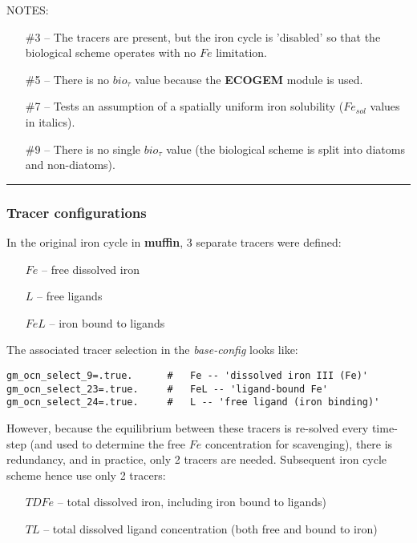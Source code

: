 \documentclass[11pt,fleqn]{book} %
\begin{document}
\noindent \small NOTES: \normalsize
\vspace{1mm}
\footnotesize
\begin{itemize}[noitemsep]
\setlength{\itemindent}{-.15in}
\item [\#3] -- The tracers are present, but the iron cycle is 'disabled' so that the biological scheme operates with no \(Fe\) limitation.
\item [\#5] -- There is no \(bio_{\tau}\) value because the \textbf{ECOGEM} module is used.
\item [\#7] -- Tests an assumption of a spatially uniform iron solubility (\(Fe_{sol}\) values in italics).
\item [\#9] -- There is no single \(bio_{\tau}\) value (the biological scheme is split into diatoms and non-diatoms).
\end{itemize}
\normalsize

%
\noindent\rule{4cm}{0.5pt}
\subsubsection{Tracer configurations}
\vspace{2mm}

In the original iron cycle in \textbf{muffin},  3 separate tracers were defined:
\vspace{1mm}
\begin{itemize}[noitemsep]
\item [\(Fe\)] -- free dissolved iron
\item [\(L\)] -- free ligands
\item [\(FeL\)] -- iron bound to ligands
\end{itemize}
\vspace{2mm}
The associated tracer selection in the \textit{base-config} looks like:
\footnotesize\vspace{-2pt}\begin{verbatim}
gm_ocn_select_9=.true.      #   Fe -- 'dissolved iron III (Fe)'
gm_ocn_select_23=.true.     #   FeL -- 'ligand-bound Fe'
gm_ocn_select_24=.true.     #   L -- 'free ligand (iron binding)' 
\end{verbatim}\vspace{-2pt}\normalsize

However, because the equilibrium between these tracers is re-solved every time-step (and used to determine the free \(Fe\) concentration for scavenging), there is redundancy, and in practice, only 2 tracers are needed. Subsequent iron cycle scheme hence use only 2 tracers:
\vspace{1mm}
\begin{itemize}[noitemsep]
\item [\(TDFe\)] -- total dissolved iron, including iron bound to ligands)
\item [\(TL\)] -- total dissolved ligand concentration (both free and bound to iron)
\end{itemize}
\vspace{2mm}
\end{document}
